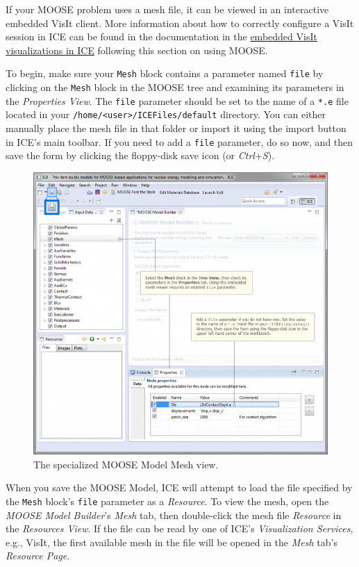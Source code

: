 If your MOOSE problem uses a mesh file, it can be viewed in an
interactive embedded VisIt client. More information about how to
correctly configure a VisIt session in ICE can be found in the
documentation in the \href{ICE_Embedded_Visualizations\#VisIt}{embedded
VisIt visualizations in ICE} following this section on using MOOSE.

To begin, make sure your \texttt{Mesh} block contains a parameter named
\texttt{file} by clicking on the \texttt{Mesh} block in the MOOSE tree
and examining its parameters in the \emph{Properties View}. The
\texttt{file} parameter should be set to the name of a \texttt{*.e} file
located in your
\texttt{/home/\textless{}user\textgreater{}/ICEFiles/default} directory.
You can either manually place the mesh file in that folder or import it
using the import button in ICE's main toolbar. If you need to add a
\texttt{file} parameter, do so now, and then save the form by clicking
the floppy-disk save icon (or \emph{Ctrl}+\emph{S}).

\begin{figure}[htbp]
\centering
\includegraphics[width=\textwidth]{figures/ICE_MOOSE_Mesh-View-1.png}
\caption{The specialized MOOSE Model Mesh view. }
\end{figure}

When you save the MOOSE Model, ICE will attempt to load the file
specified by the \texttt{Mesh} block's \texttt{file} parameter as a
\emph{Resource}. To view the mesh, open the \emph{MOOSE Model Builder}'s
\emph{Mesh} tab, then double-click the mesh file \emph{Resource} in the
\emph{Resources View}. If the file can be read by one of ICE's
\emph{Visualization Services}, e.g., VisIt, the first available mesh in
the file will be opened in the \emph{Mesh} tab's \emph{Resource Page}.

